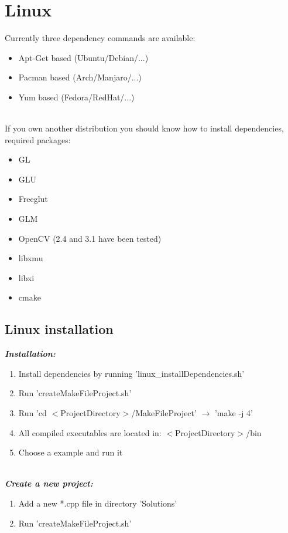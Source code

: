 \documentclass[]{article}
\begin{document}
\newpage
\section{Linux}\label{Linux}
Currently three dependency commands are available:
\begin{itemize}
	\item Apt-Get based (Ubuntu/Debian/...) 
	\item Pacman based (Arch/Manjaro/...)
	\item Yum based (Fedora/RedHat/...) 
\end{itemize}

\mbox{} \\
If you own another distribution you should know how to install dependencies, required packages:
\begin{itemize}
	\item GL
	\item GLU
	\item Freeglut
	\item GLM
	\item OpenCV (2.4 and 3.1 have been tested)
	\item libxmu 
	\item libxi
	\item cmake 
\end{itemize}

\subsection{Linux installation}

\textit{\textbf{Installation:}}
\begin{enumerate}
	\item Install dependencies by running 'linux\_installDependencies.sh'
	\item Run 'createMakeFileProject.sh'
	\item Run 'cd $<$ProjectDirectory$>$/MakeFileProject' $\rightarrow$ 'make -j 4'
	\item All compiled executables are located in: $<$ProjectDirectory$>$/bin
	\item Choose a example and run it 
\end{enumerate}

\mbox{} \\
\textit{\textbf{Create a new project:}}
\begin{enumerate}
\item Add a new *.cpp file in directory 'Solutions'
\item Run 'createMakeFileProject.sh' 
\end{enumerate}
\end{document}
